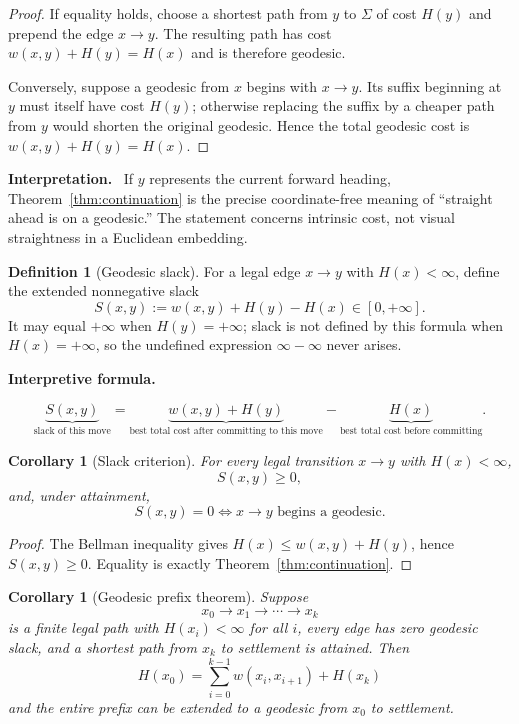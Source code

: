 \documentclass[11pt]{article}
\newtheorem{corollary}[theorem]{Corollary}
\theoremstyle{definition}
\newtheorem{definition}[theorem]{Definition}
\theoremstyle{remark}
\newcommand{\Sett}{\Sigma}
\newcommand{\Slack}{S}
\newenvironment{interpretiveformula}{%
  \begin{center}\begin{minipage}{0.92\linewidth}\small
  \textbf{Interpretive formula.}\ \raggedright}{\end{minipage}\end{center}}
\newenvironment{interpretation}{%
  \begin{center}\begin{minipage}{0.92\linewidth}\small
  \textbf{Interpretation.}\ }{\end{minipage}\end{center}}
\begin{document}
\begin{proof}
If equality holds, choose a shortest path from $y$ to $\Sett$ of cost $H(y)$ and prepend the edge $x\to y$. The resulting path has cost $w(x,y)+H(y)=H(x)$ and is therefore geodesic.

Conversely, suppose a geodesic from $x$ begins with $x\to y$. Its suffix beginning at $y$ must itself have cost $H(y)$; otherwise replacing the suffix by a cheaper path from $y$ would shorten the original geodesic. Hence the total geodesic cost is $w(x,y)+H(y)=H(x)$.
\end{proof}

\begin{interpretation}
If $y$ represents the current forward heading, Theorem~\ref{thm:continuation} is the precise coordinate-free meaning of ``straight ahead is on a geodesic.'' The statement concerns intrinsic cost, not visual straightness in a Euclidean embedding.
\end{interpretation}

\begin{definition}[Geodesic slack]
For a legal edge $x\to y$ with $H(x)<\infty$, define the extended nonnegative slack
\[
\Slack(x,y):=w(x,y)+H(y)-H(x)\in[0,+\infty].
\]
It may equal $+\infty$ when $H(y)=+\infty$; slack is not defined by this formula when $H(x)=+\infty$, so the undefined expression $\infty-\infty$ never arises.
\end{definition}

\begin{interpretiveformula}
\[
\underbrace{\Slack(x,y)}_{\text{slack of this move}}
=
\underbrace{w(x,y)+H(y)}_{\text{best total cost after committing to this move}}
-
\underbrace{H(x)}_{\text{best total cost before committing}}.
\]
\end{interpretiveformula}

\begin{corollary}[Slack criterion]
For every legal transition $x\to y$ with $H(x)<\infty$,
\[
\Slack(x,y)\ge 0,
\]
and, under attainment,
\[
\Slack(x,y)=0
\iff
x\to y\text{ begins a geodesic}.
\]
\end{corollary}

\begin{proof}
The Bellman inequality gives $H(x)\le w(x,y)+H(y)$, hence $\Slack(x,y)\ge0$. Equality is exactly Theorem~\ref{thm:continuation}.
\end{proof}

\begin{corollary}[Geodesic prefix theorem]\label{cor:prefix}
Suppose
\[
x_0\to x_1\to\cdots\to x_k
\]
is a finite legal path with $H(x_i)<\infty$ for all $i$, every edge has zero geodesic slack, and a shortest path from $x_k$ to settlement is attained. Then
\[
\boxed{
H(x_0)=\sum_{i=0}^{k-1}w(x_i,x_{i+1})+H(x_k)
}
\]
and the entire prefix can be extended to a geodesic from $x_0$ to settlement.
\end{corollary}
\end{document}
